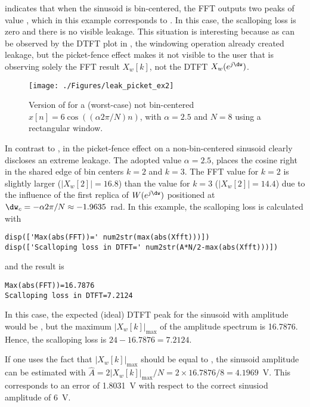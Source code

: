  indicates that when the sinusoid is bin-centered, the FFT outputs two peaks of value , which
in this example corresponds to . In this case, the scalloping loss is zero and there is no visible
leakage. This situation is interesting because as can be observed by the DTFT plot in , the windowing
operation already created leakage, but the picket-fence effect makes it not visible to the user that is observing
solely the FFT result $X_w[k]$, not the DTFT $X_w(e^{j \dw})$.

\begin{figure}[htbp]
\centering
\texttt{[image: ./Figures/leak\_picket\_ex2]}
\caption{Version of  for a (worst-case) not bin-centered $x[n]=6\cos((\alpha 2 \pi /N) n)$, with $\alpha=2.5$ and $N=8$ using a rectangular window.\label{fig:leak_picket_ex2}}
\end{figure}

In contrast to , in  the picket-fence effect on a non-bin-centered sinusoid clearly discloses an extreme leakage.
The adopted value $\alpha=2.5$, places the cosine right in the shared edge of bin centers $k=2$ and $k=3$. The FFT value for $k=2$ is slightly larger
($|X_w[2]|=16.8$) than the value for $k=3$ ($|X_w[2]|=14.4$) due to the influence of the first replica of $W(e^{j \dw})$ positioned at
$\dw_c = - \alpha 2 \pi / N \approx -1.9635$~rad.
In this example, the scalloping loss is calculated with
\begin{lstlisting}
disp(['Max(abs(FFT))=' num2str(max(abs(Xfft)))])
disp(['Scalloping loss in DTFT=' num2str(A*N/2-max(abs(Xfft)))])
\end{lstlisting}
and the result is 
\begin{lstlisting}
Max(abs(FFT))=16.7876
Scalloping loss in DTFT=7.2124
\end{lstlisting}
In this case, the expected (ideal) DTFT peak for the sinusoid with amplitude  would be , but
the maximum $|X_w[k]|_{\textrm{max}}$ of the amplitude spectrum is 16.7876. Hence, the scalloping loss is $24 - 16.7876 = 7.2124$.

If one uses the fact that $|X_w[k]|_{\textrm{max}}$ should be equal to , the sinusoid amplitude can be estimated with $\hat A = 2 |X_w[k]|_{\textrm{max}} / N = 2 \times 16.7876 / 8 = 4.1969$~V. This corresponds to an error of 1.8031~V with respect to the correct sinusiod amplitude of 6~V.

